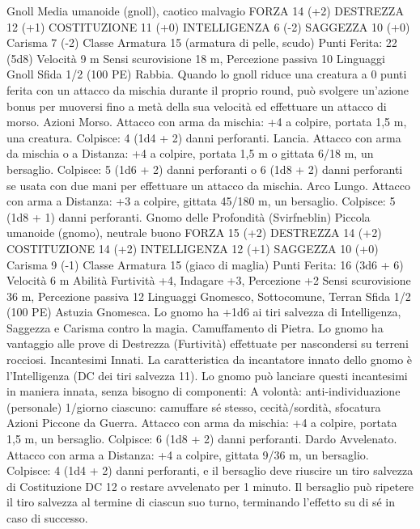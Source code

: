 \begin{multicols}{2}
Gnoll
Media umanoide (gnoll), caotico malvagio
FORZA 14 (+2)
DESTREZZA 12 (+1)
COSTITUZIONE 11 (+0)
INTELLIGENZA 6 (-2)
SAGGEZZA 10 (+0)
Carisma 7 (-2)
Classe Armatura 15 (armatura di pelle, scudo)
\hspace*{0pt}\hfill{Punti Ferita}: 22 (5d8)
Velocità 9 m
Sensi scurovisione 18 m, Percezione passiva 10
Linguaggi Gnoll
Sfida 1/2 (100 PE)
Rabbia. Quando lo gnoll riduce una creatura a 0 punti ferita con
un attacco da mischia durante il proprio round, può svolgere
un’azione bonus per muoversi fino a metà della sua velocità ed
effettuare un attacco di morso.
Azioni
Morso. Attacco con arma da mischia: +4 a colpire, portata 1,5
m, una creatura.
Colpisce: 4 (1d4 + 2) danni perforanti.
Lancia. Attacco con arma da mischia o a Distanza: +4 a colpire,
portata 1,5 m o gittata 6/18 m, un bersaglio.
Colpisce: 5 (1d6 + 2) danni perforanti o 6 (1d8 + 2) danni
perforanti se usata con due mani per effettuare un attacco da
mischia.
Arco Lungo. Attacco con arma a Distanza: +3 a colpire, gittata
45/180 m, un bersaglio.
Colpisce: 5 (1d8 + 1) danni perforanti.
Gnomo delle
Profondità (Svirfneblin)
Piccola umanoide (gnomo), neutrale buono
FORZA 15 (+2)
DESTREZZA 14 (+2)
COSTITUZIONE 14 (+2)
INTELLIGENZA 12 (+1)
SAGGEZZA 10 (+0)
Carisma 9 (-1)
Classe Armatura 15 (giaco di maglia)
\hspace*{0pt}\hfill{Punti Ferita}: 16 (3d6 + 6)
Velocità 6 m
Abilità Furtività +4, Indagare +3, Percezione +2
Sensi scurovisione 36 m, Percezione passiva 12
Linguaggi Gnomesco, Sottocomune, Terran
Sfida 1/2 (100 PE)
Astuzia Gnomesca. Lo gnomo ha +1d6 ai tiri salvezza di
Intelligenza, Saggezza e Carisma contro la magia.
Camuffamento di Pietra. Lo gnomo ha vantaggio alle prove di
Destrezza (Furtività) effettuate per nascondersi su terreni
rocciosi.
Incantesimi Innati. La caratteristica da incantatore innato dello
gnomo è l’Intelligenza (DC dei tiri salvezza 11). Lo gnomo può
lanciare questi incantesimi in maniera innata, senza bisogno di
componenti:
A volontà: anti-individuazione (personale)
1/giorno ciascuno: camuffare sé stesso, cecità/sordità, sfocatura
Azioni
Piccone da Guerra. Attacco con arma da mischia: +4 a colpire,
portata 1,5 m, un bersaglio.
Colpisce: 6 (1d8 + 2) danni perforanti.
Dardo Avvelenato. Attacco con arma a Distanza: +4 a colpire,
gittata 9/36 m, un bersaglio.
Colpisce: 4 (1d4 + 2) danni perforanti, e il bersaglio deve
riuscire un tiro salvezza di Costituzione DC 12 o restare
avvelenato per 1 minuto. Il bersaglio può ripetere il tiro salvezza
al termine di ciascun suo turno, terminando l’effetto su di sé in
caso di successo.

\end{multicols}
